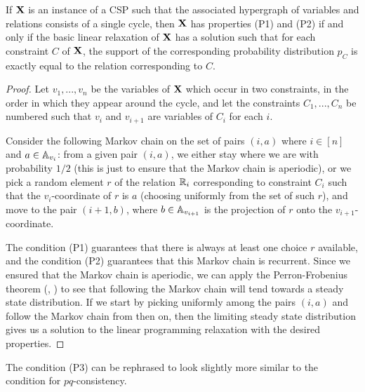 \documentclass[letterpaper,11pt]{article}
\begin{document}
\begin{thm} If $\mathbf{X}$ is an instance of a CSP such that the associated hypergraph of variables and relations consists of a single cycle, then $\mathbf{X}$ has properties (P1) and (P2) if and only if the basic linear relaxation of $\mathbf{X}$ has a solution such that for each constraint $C$ of $\mathbf{X}$, the support of the corresponding probability distribution $p_C$ is exactly equal to the relation corresponding to $C$.
\end{thm}
\begin{proof} Let $v_1, ..., v_n$ be the variables of $\mathbf{X}$ which occur in two constraints, in the order in which they appear around the cycle, and let the constraints $C_1, ..., C_n$ be numbered such that $v_i$ and $v_{i+1}$ are variables of $C_i$ for each $i$.

Consider the following Markov chain on the set of pairs $(i,a)$ where $i \in [n]$ and $a \in \mathbb{A}_{v_i}$: from a given pair $(i,a)$, we either stay where we are with probability $1/2$ (this is just to ensure that the Markov chain is aperiodic), or we pick a random element $r$ of the relation $\mathbb{R}_i$ corresponding to constraint $C_i$ such that the $v_i$-coordinate of $r$ is $a$ (choosing uniformly from the set of such $r$), and move to the pair $(i+1,b)$, where $b \in \mathbb{A}_{v_{i+1}}$ is the projection of $r$ onto the $v_{i+1}$-coordinate.

The condition (P1) guarantees that there is always at least one choice $r$ available, and the condition (P2) guarantees that this Markov chain is recurrent. Since we ensured that the Markov chain is aperiodic, we can apply the Perron-Frobenius theorem (\cite{perron-matrix}, \cite{frobenius-matrix}) to see that following the Markov chain will tend towards a steady state distribution. If we start by picking uniformly among the pairs $(i,a)$ and follow the Markov chain from then on, then the limiting steady state distribution gives us a solution to the linear programming relaxation with the desired properties.
\end{proof}

The condition (P3) can be rephrased to look slightly more similar to the condition for $pq$-consistency.
\end{document}
